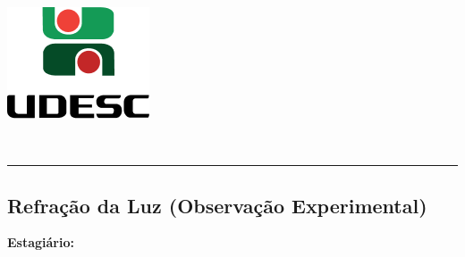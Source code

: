 %
\begin{center}
    \begin{minipage}[!]{\linewidth}
        \begin{minipage}[!]{.19\linewidth}
            \includegraphics[width=\linewidth]{img/logo.png}           
        \end{minipage}
        \begin{minipage}[!]{.8\linewidth}
            \center
            \ABNTEXchapterfont\normalsize\MakeUppercase{\imprimirinstituicao}
            \par
            \vspace*{10pt}                     
            \ABNTEXchapterfont\normalsize\MakeUppercase{\centro}
            \par
            \vspace*{10pt}           
            \ABNTEXchapterfont\normalsize\MakeUppercase{\disciplina}
        \end{minipage}        
    \end{minipage}
    \\ \vspace{0.5cm}
    \rule{\textwidth}{.5pt}   
\end{center}

\textual
    \begin{center}
        \section{Refração da Luz (Observação Experimental)} 
        \par
    \end{center}        
        \noindent \textbf{Estagiário:} \imprimirautor 
        
